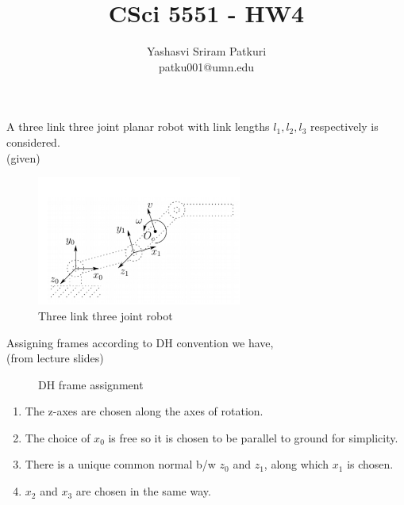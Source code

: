 \documentclass[12pt]{article}
\title{CSci 5551 - HW4}
\author{Yashasvi Sriram Patkuri\\patku001@umn.edu}
\newcommand{\fromlectures}{{\\ \color{blue} \hspace*{\fill}(from lecture slides)} \\}
\newcommand{\given}{{\\ \color{blue} \hspace*{\fill}(given)} \\}
\begin{document}
\maketitle
\pagebreak

\section{}
A three link three joint planar robot with link lengths $l_1, l_2, l_3$ respectively is considered.
\given

\begin{figure}[h]
  \centering
  \includegraphics[width=0.6\textwidth]{q1.png}
  \caption{Three link three joint robot}
  \label{fig:q1.1}
\end{figure}
Assigning frames according to DH convention we have,
\fromlectures
\begin{figure}[h]
  \centering
  \caption{DH frame assignment}
  \label{fig:q1.2}
\end{figure}

\begin{enumerate}[nolistsep]
  \item The z-axes are chosen along the axes of rotation.
  \item The choice of $x_0$ is free so it is chosen to be parallel to ground for simplicity.
  \item There is a unique common normal b/w $z_0$ and $z_1$, along which $x_1$ is chosen.
  \item $x_2$ and $x_3$ are chosen in the same way.
\end{enumerate}
\end{document}
